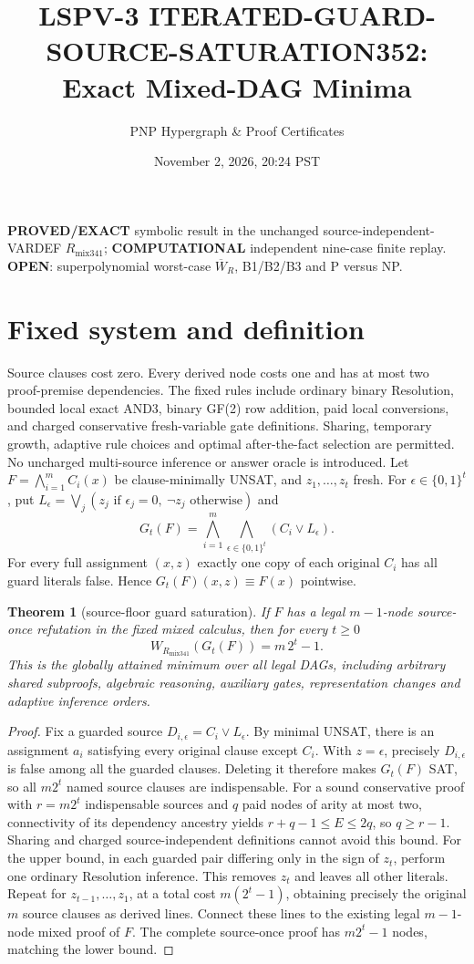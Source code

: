 \documentclass[11pt]{article}
\title{LSPV-3 ITERATED-GUARD-SOURCE-SATURATION352: Exact Mixed-DAG Minima}
\author{PNP Hypergraph \& Proof Certificates}
\date{November 2, 2026, 20:24 PST}
\newtheorem{theorem}{Theorem}
\begin{document}
\maketitle
\noindent\textbf{PROVED/EXACT} symbolic result in the unchanged source-independent-VARDEF $R_{\mathrm{mix341}}$; \textbf{COMPUTATIONAL} independent nine-case finite replay. \textbf{OPEN}: superpolynomial worst-case $\overline W_R$, B1/B2/B3 and P versus NP.
\section*{Fixed system and definition}
Source clauses cost zero. Every derived node costs one and has at most two proof-premise dependencies. The fixed rules include ordinary binary Resolution, bounded local exact AND3, binary GF(2) row addition, paid local conversions, and charged conservative fresh-variable gate definitions. Sharing, temporary growth, adaptive rule choices and optimal after-the-fact selection are permitted. No uncharged multi-source inference or answer oracle is introduced.
Let $F=\bigwedge_{i=1}^m C_i(x)$ be clause-minimally UNSAT, and $z_1,\ldots,z_t$ fresh. For $\epsilon\in\{0,1\}^t$, put $L_\epsilon=\bigvee_j (z_j\text{ if }\epsilon_j=0,\ \neg z_j\text{ otherwise})$ and
\[
G_t(F)=\bigwedge_{i=1}^m\bigwedge_{\epsilon\in\{0,1\}^t}(C_i\vee L_\epsilon).
\]
For every full assignment $(x,z)$ exactly one copy of each original $C_i$ has all guard literals false. Hence $G_t(F)(x,z)\equiv F(x)$ pointwise.
\begin{theorem}[source-floor guard saturation]
If $F$ has a legal $m-1$-node source-once refutation in the fixed mixed calculus, then for every $t\ge0$
\[
\boxed{W_{R_{\mathrm{mix341}}}(G_t(F))=m\,2^t-1.}
\]
This is the globally attained minimum over all legal DAGs, including arbitrary shared subproofs, algebraic reasoning, auxiliary gates, representation changes and adaptive inference orders.
\end{theorem}
\begin{proof}
Fix a guarded source $D_{i,\epsilon}=C_i\vee L_\epsilon$. By minimal UNSAT, there is an assignment $a_i$ satisfying every original clause except $C_i$. With $z=\epsilon$, precisely $D_{i,\epsilon}$ is false among all the guarded clauses. Deleting it therefore makes $G_t(F)$ SAT, so all $m2^t$ named source clauses are indispensable. For a sound conservative proof with $r=m2^t$ indispensable sources and $q$ paid nodes of arity at most two, connectivity of its dependency ancestry yields $r+q-1\le E\le2q$, so $q\ge r-1$. Sharing and charged source-independent definitions cannot avoid this bound.
For the upper bound, in each guarded pair differing only in the sign of $z_t$, perform one ordinary Resolution inference. This removes $z_t$ and leaves all other literals. Repeat for $z_{t-1},\ldots,z_1$, at a total cost $m(2^t-1)$, obtaining precisely the original $m$ source clauses as derived lines. Connect these lines to the existing legal $m-1$-node mixed proof of $F$. The complete source-once proof has $m2^t-1$ nodes, matching the lower bound.
\end{proof}
\end{document}
